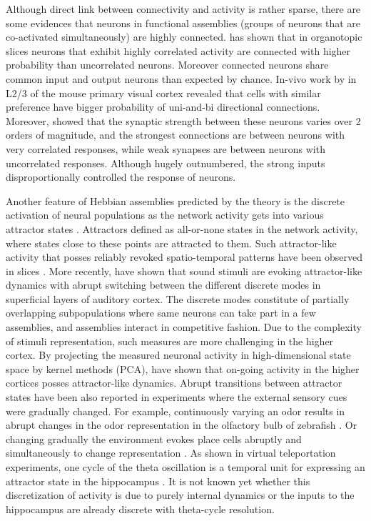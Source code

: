     Although direct link between connectivity and activity is rather sparse,
    there are some evidences that neurons in functional assemblies (groups of
    neurons that are co-activated simultaneously) are highly connected.
    \cite{Takahashi2010} has shown that in organotopic slices neurons that
    exhibit highly correlated activity are connected with higher probability
    than uncorrelated neurons. Moreover connected neurons share common input
    and output neurons than expected by chance. In-vivo work by \cite{Ko2011}
    in L2/3 of the mouse primary visual cortex revealed that cells with similar
    preference have bigger probability of uni-and-bi directional connections.
    Moreover, \cite{Cossell2015} showed that the synaptic strength between
    these neurons varies over 2 orders of magnitude, and the strongest
    connections are between neurons with very correlated responses, while weak
    synapses are between neurons with uncorrelated responses. Although hugely
    outnumbered, the strong inputs disproportionally controlled the response of
    neurons. 

    Another feature of Hebbian assemblies predicted by the theory is the
    discrete activation of neural populations as the network activity gets into
    various attractor states \cite{Hopfield1982}. Attractors defined as
    all-or-none states in the network activity, where states close to these
    points are attracted to them. Such attractor-like activity that posses
    reliably revoked spatio-temporal patterns have been observed in slices
    \cite[e.g.,][]{Cossart2003, MacLean2005}. More recently,
    \cite{Bathellier2012} have shown that sound stimuli are evoking
    attractor-like dynamics with abrupt switching between the different
    discrete modes in superficial layers of auditory cortex. The discrete modes
    constitute of partially overlapping subpopulations where same neurons can
    take part in a few assemblies, and assemblies interact in competitive
    fashion. Due to the complexity of stimuli representation, such measures are
    more challenging in the higher cortex. By projecting the measured neuronal
    activity in high-dimensional state space by kernel methods (PCA),
    \cite{Balaguer2011} have shown that on-going activity in the higher
    cortices posses attractor-like dynamics. Abrupt transitions between
    attractor states have been also reported in experiments where the external
    sensory cues were gradually changed. For example, continuously varying an
    odor results in abrupt changes in the odor representation in the olfactory
    bulb of zebrafish \citep{Niessing2010}. Or changing gradually the
    environment evokes place cells abruptly and simultaneously to change
    representation \citep{Wills2005}. As shown in virtual teleportation
    experiments, one cycle of the theta oscillation is a temporal unit for
    expressing an attractor state in the hippocampus \citep{Jezek2011}. It is
    not known yet whether this discretization of activity is due to purely
    internal dynamics or the inputs to the hippocampus are already discrete
    with theta-cycle resolution. 

